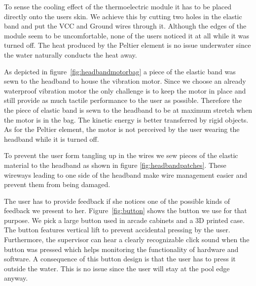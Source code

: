 To sense the cooling effect of the thermoelectric module it has to be placed directly onto the users skin.
We achieve this by cutting two holes in the elastic band and put the VCC and Ground wires through it. 
Although the edges of the module seem to be uncomfortable, none of the users noticed it at all while it was turned off.
The heat produced by the Peltier element is no issue underwater since the water naturally conducts the heat away.


As depicted in figure~\ref{fig:headbandmotorbag} a piece of the elastic band was sewn to the headband to house the vibration motor.
Since we choose an already waterproof vibration motor the only challenge is to keep the motor in place and still provide as much tactile performance to the user as possible.
Therefore the the piece of elastic band is sewn to the headband to be at maximum stretch when the motor is in the bag.
The kinetic energy is better transferred by rigid objects.
As for the Peltier element, the motor is not perceived by the user wearing the headband while it is turned off.


To prevent the user form tangling up in the wires we sew pieces of the elastic material to the headband as shown in figure \ref{fig:headbandpatches}.
These wireways leading to one side of the headband make wire management easier and prevent them from being damaged.


The user has to provide feedback if she notices one of the possible kinds of feedback we present to her.
Figure~\ref{fig:button} shows the button we use for that purpose.
We pick a large button used in arcade cabinets and a 3D printed case. 
The button features vertical lift to prevent accidental pressing by the user. 
Furthermore, the supervisor can hear a clearly recognizable click sound when the button was pressed which helps monitoring the functionality of hardware and software.
A consequence of this button design is that the user has to press it outside the water.
This is no issue since the user will stay at the pool edge anyway.

